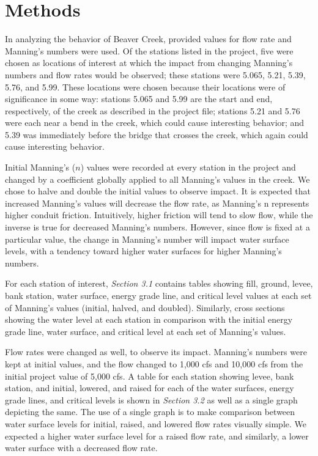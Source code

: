 \documentclass{article}
\begin{document}
\section{Methods}
\par In analyzing the behavior of Beaver Creek, provided values for flow rate and Manning's numbers were used. Of the stations listed in the project, five were chosen as locations of interest at which the impact from changing Manning's numbers and flow rates would be observed; these stations were 5.065, 5.21, 5.39, 5.76, and 5.99. These locations were chosen because their locations were of significance in some way: stations 5.065 and 5.99 are the start and end, respectively, of the creek as described in the project file; stations 5.21 and 5.76 were each near a bend in the creek, which could cause interesting behavior; and 5.39 was immediately before the bridge that crosses the creek, which again could cause interesting behavior. 
\par Initial Manning's ($n$) values were recorded at every station in the project and changed by a coefficient globally applied to all Manning's values in the creek. We chose to halve and double the initial values to observe impact. It is expected that increased Manning's values will decrease the flow rate, as Manning's n represents higher conduit friction. Intuitively, higher friction will tend to slow flow, while the inverse is true for decreased Manning's numbers. However, since flow is fixed at a particular value, the change in Manning's number will impact water surface levels, with a tendency toward higher water surfaces for higher Manning's numbers. 
\par For each station of interest, \emph{Section 3.1} contains tables showing fill, ground, levee, bank station, water surface, energy grade line, and critical level values at each set of Manning's values (initial, halved, and doubled). Similarly, cross sections showing the water level at each station in comparison with the initial energy grade line, water surface, and critical level at each set of Manning's values. 
\par Flow rates were changed as well, to observe its impact. Manning's numbers were kept at initial values, and the flow changed to 1,000 cfs and 10,000 cfs from the initial project value of 5,000 cfs. A table for each station showing levee, bank station, and initial, lowered, and raised for each of the water surfaces, energy grade lines, and critical levels is shown in \emph{Section 3.2} as well as a single graph depicting the same. The use of a single graph is to make comparison between water surface levels for initial, raised, and lowered flow rates visually simple. We expected a higher water surface level for a raised flow rate, and similarly, a lower water surface with a decreased flow rate. 
\end{document}
